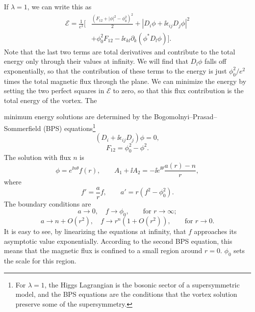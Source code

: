 If $\lambda=1$, we can write this as
\begin{equation}
\begin{split}
  \mathcal E=\frac{1}{e^2}\bigg[&\frac{(F_{12}+|\phi|^2-\phi_0^2)^2}{2}
  +|D_i\phi+\ii\epsilon_{ij}D_j\phi|^2\\
  &+\phi_0^2F_{12}-\ii\epsilon_{kl}\partial_k(\phi^*D_l\phi)\bigg].
\end{split}
  \label{eq:8.2}
\end{equation}
Note that the last two terms are total derivatives and contribute to the total
energy only through their values at infinity. We will find that $D_l\phi$ falls
off exponentially, so that the contribution of these terms to the energy is
just $\phi_0^2/e^2$ times the total magnetic flux through the plane. We can
minimize the energy by setting the two perfect squares in $\mathcal E$ to zero,
so that this flux contribution is the total energy of the vortex. The

minimum energy solutions are determined by the Bogomolnyi--Prasad--Sommerfield
(BPS) \cite{banks-ref-82,banks-ref-83} equations\footnote[10]{For $\lambda=1$, the Higgs Lagrangian
is the bosonic sector of a supersymmetric model, and the BPS equations are the
conditions that the vortex solution preserve some of the supersymmetry.}
\begin{equation}
  (D_i+\ii\epsilon_{ij}D_j)\phi=0,
  \label{eq:8.3}
\end{equation}
\begin{equation}
  F_{12}=\phi_0^2-\phi^2.
  \label{eq:8.4}
\end{equation}
The solution with flux $n$ is
\begin{equation*}
  \phi=e^{\ii n\theta}f(r),
  \qquad A_1+\ii A_2=-\ii e^{\ii\theta}\frac{a(r)-n}{r},
\end{equation*}
where
\begin{equation*}
  f'=\frac{a}{r}f,
  \qquad a'=r(f^2-\phi_0^2).
\end{equation*}
The boundary conditions are
\begin{equation*}
  a\to0,\quad f\to\phi_0,\qquad\text{for }r\to\infty;
\end{equation*}
\begin{equation*}
  a\to n+O(r^2),\quad f\to r^n(1+O(r^2)),
  \qquad\text{for }r\to0.
\end{equation*}
It is easy to see, by linearizing the equations at infinity, that $f$ approaches
its asymptotic value exponentially. According to the second BPS equation, this
means that the magnetic flux is confined to a small region around $r=0$.
$\phi_0$ sets the scale for this region.

